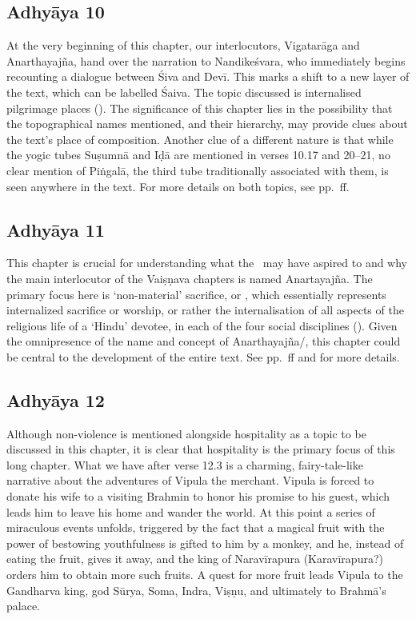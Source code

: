 \subsection{Adhyāya 10}\label{contents_of_ch10}
At the very beginning of this chapter, our interlocutors, Vigatarāga and Anarthayajña,
hand over the narration to Nandikeśvara, who immediately begins recounting
a dialogue between Śiva and Devī. This marks a shift to a new layer of the text,
which can be labelled Śaiva. The topic discussed is internalised pilgrimage places ().
The significance of this chapter lies in the possibility that the topographical
names mentioned, and their hierarchy, may provide clues about the text's
place of composition. Another clue of a different nature is that
while the yogic tubes Suṣumnā and Iḍā are mentioned in verses 10.17 and 20--21,
no clear mention of Piṅgalā, the third tube traditionally associated with them,
is seen anywhere in the text. For more details on both topics, see pp.~\pageref{provenance}ff.

\subsection{Adhyāya 11}\label{contents_of_ch11}
This chapter is crucial for understanding what the \VSS\ may have aspired to and 
why the main interlocutor of the Vaiṣṇava chapters is named Anartayajña. The primary
focus here is `non-material' sacrifice, or , which essentially
represents internalized sacrifice or worship, or rather the internalisation of all aspects of
the religious life of a `Hindu' devotee, in each of the four social disciplines ().
Given the omnipresence of the name and concept of Anarthayajña/, 
this chapter could be central to the development of the entire text. 
See pp.~\pageref{nonmaterial}ff and  for more details.
 


\subsection{Adhyāya 12}\label{contents_of_ch12}
Although non-violence is mentioned alongside hospitality as a
topic to be discussed in this chapter, it is clear that hospitality 
is the primary focus of this long chapter.
What we have after verse 12.3 is a charming, fairy-tale-like narrative
about the adventures of Vipula the merchant. 
Vipula is forced to donate his wife to a visiting 
Brahmin to honor his promise to his guest, 
which leads him to leave his home and wander the world.
At this point a series of miraculous events unfolds,
triggered by the fact that a magical fruit with the power of bestowing 
youthfulness is gifted to him by a monkey, and he, instead 
of eating the fruit, gives it away, and the king of Naravīrapura (Karavīrapura?)
orders him to obtain more such fruits. A quest for more fruit
leads Vipula to the Gandharva king, god Sūrya, Soma, Indra, Viṣṇu, and
ultimately to Brahmā's palace.

